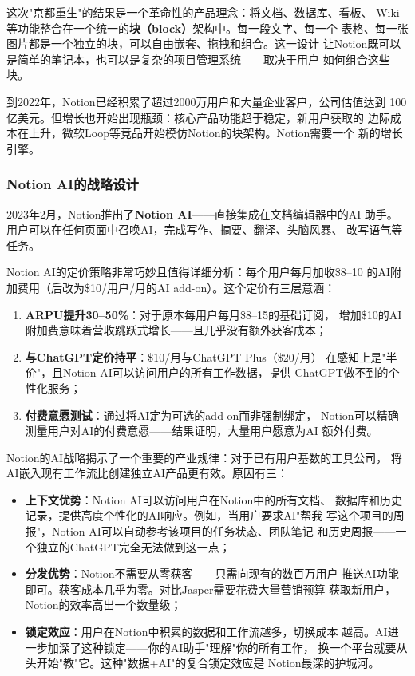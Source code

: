 这次"京都重生"的结果是一个革命性的产品理念：将文档、数据库、看板、
Wiki等功能整合在一个统一的\textbf{块（block）}架构中。每一段文字、每一个
表格、每一张图片都是一个独立的块，可以自由嵌套、拖拽和组合。这一设计
让Notion既可以是简单的笔记本，也可以是复杂的项目管理系统——取决于用户
如何组合这些块。

到2022年，Notion已经积累了超过2000万用户和大量企业客户，公司估值达到
100亿美元。但增长也开始出现瓶颈：核心产品功能趋于稳定，新用户获取的
边际成本在上升，微软Loop等竞品开始模仿Notion的块架构。Notion需要一个
新的增长引擎。

\subsubsection{Notion AI的战略设计}
2023年2月，Notion推出了\textbf{Notion AI}——直接集成在文档编辑器中的AI
助手。用户可以在任何页面中召唤AI，完成写作、摘要、翻译、头脑风暴、
改写语气等任务。

Notion AI的定价策略非常巧妙且值得详细分析：每个用户每月加收\$8--10
的AI附加费用（后改为\$10/用户/月的AI add-on）。这个定价有三层意涵：

\begin{enumerate}
  \item \textbf{ARPU提升30--50\%}：对于原本每用户每月\$8--15的基础订阅，
    增加\$10的AI附加费意味着营收跳跃式增长——且几乎没有额外获客成本；
  \item \textbf{与ChatGPT定价持平}：\$10/月与ChatGPT Plus（\$20/月）
    在感知上是"半价"，且Notion AI可以访问用户的所有工作数据，提供
    ChatGPT做不到的个性化服务；
  \item \textbf{付费意愿测试}：通过将AI定为可选的add-on而非强制绑定，
    Notion可以精确测量用户对AI的付费意愿——结果证明，大量用户愿意为AI
    额外付费。
\end{enumerate}

\begin{whybox}
Notion的AI战略揭示了一个重要的产业规律：对于已有用户基数的工具公司，
将AI嵌入现有工作流比创建独立AI产品更有效。原因有三：
\begin{itemize}
  \item \textbf{上下文优势}：Notion AI可以访问用户在Notion中的所有文档、
    数据库和历史记录，提供高度个性化的AI响应。例如，当用户要求AI"帮我
    写这个项目的周报"，Notion AI可以自动参考该项目的任务状态、团队笔记
    和历史周报——一个独立的ChatGPT完全无法做到这一点；
  \item \textbf{分发优势}：Notion不需要从零获客——只需向现有的数百万用户
    推送AI功能即可。获客成本几乎为零。对比Jasper需要花费大量营销预算
    获取新用户，Notion的效率高出一个数量级；
  \item \textbf{锁定效应}：用户在Notion中积累的数据和工作流越多，切换成本
    越高。AI进一步加深了这种锁定——你的AI助手"理解"你的所有工作，
    换一个平台就要从头开始"教"它。这种"数据+AI"的复合锁定效应是
    Notion最深的护城河。
\end{itemize}
\end{whybox}

